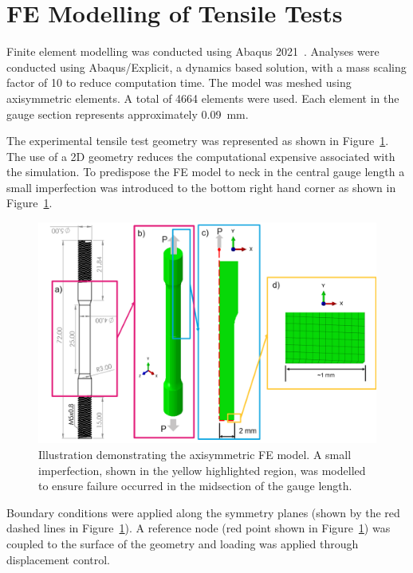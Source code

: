 \documentclass[preprint, review, 12pt]{elsarticle}
\begin{document}
	\section{FE Modelling of Tensile Tests}
	\label{h:fem}

	Finite element modelling was conducted using Abaqus 2021~\cite{DASSAULT2021}.
	Analyses were conducted using Abaqus/Explicit, a dynamics based solution, with a mass scaling factor of 10 to reduce computation time.
	The model was meshed using axisymmetric elements.
	A total of 4664 elements were used.
	Each element in the gauge section represents approximately 0.09~mm.

	The experimental tensile test geometry was represented as shown in Figure~\ref{fig:fe_model}.
	The use of a 2D geometry reduces the computational expensive associated with the simulation.
	To predispose the FE model to neck in the central gauge length a small imperfection was introduced to the bottom right hand corner as shown in Figure~\ref{fig:fe_model}.

	\begin{figure}[!htbp]
		\centering
		\includegraphics[width=\linewidth, height=0.5\textheight, keepaspectratio]{MODEL_3D_2D}
		\caption{Illustration demonstrating the axisymmetric FE model. A small imperfection, shown in the yellow highlighted region, was modelled to ensure failure occurred in the midsection of the gauge length.}
		\label{fig:fe_model}
	\end{figure}

	Boundary conditions were applied along the symmetry planes (shown by the red dashed lines in Figure~\ref{fig:fe_model}).
	A reference node (red point shown in Figure~\ref{fig:fe_model}) was coupled to the surface of the geometry and loading was applied through displacement control.
\end{document}
